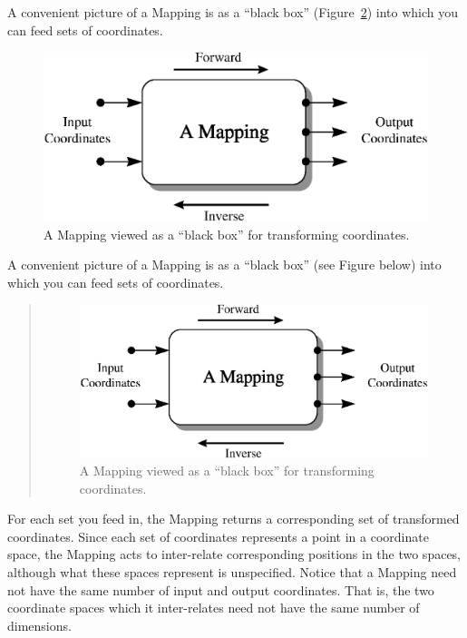 \documentclass[twoside,11pt]{article}
\newenvironment{latexonly}{}{}
\begin{document}
\begin{latexonly}
   A convenient picture of a Mapping is as a ``black box''
   (Figure~\ref{fig:mapping}) into which you can feed sets of
   coordinates.
   \begin{figure}[bhtp]
   \begin{center}
   \includegraphics[scale=0.7]{sun211_figures/mapping.eps}
   \caption{A Mapping viewed as a ``black box'' for transforming coordinates.}
   \label{fig:mapping}
   \end{center}
   \end{figure}
\end{latexonly}
\begin{htmlonly}
   A convenient picture of a Mapping is as a ``black box'' (see Figure
   below) into which you can feed sets of coordinates.
   \begin{quote}
   \begin{figure}[bhtp]
   \label{fig:mapping}
   \includegraphics[scale=1.2]{sun211_figures/mapping.eps}
   \caption{A Mapping viewed as a ``black box'' for transforming coordinates.}
   \end{figure}
   \end{quote}
\end{htmlonly}
For each set you feed in, the Mapping returns a corresponding set of
transformed coordinates. Since each set of coordinates represents a
point in a coordinate space, the Mapping acts to inter-relate
corresponding positions in the two spaces, although what these spaces
represent is unspecified.  Notice that a Mapping need not have the
same number of input and output coordinates. That is, the two
coordinate spaces which it inter-relates need not have the same number
of dimensions.
\end{document}
